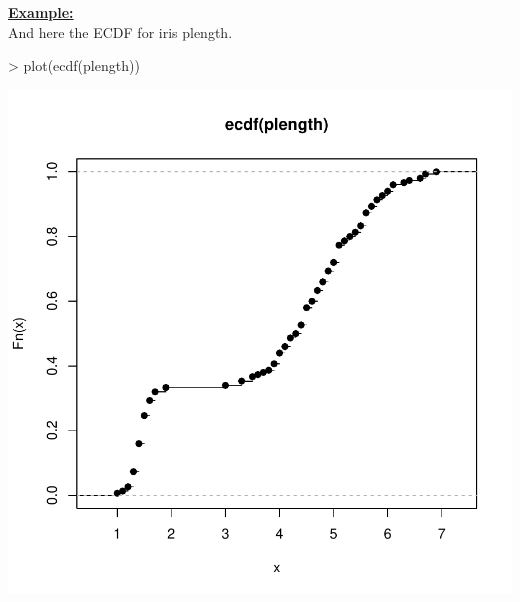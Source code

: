 \noindent
\underline{\bf Example:} \\
And here the ECDF for iris plength.

\begin{Schunk}
\begin{Sinput}
> plot(ecdf(plength)) 
\end{Sinput}
\end{Schunk}
\includegraphics{lect_chapter5_v2-037}


\newpage


